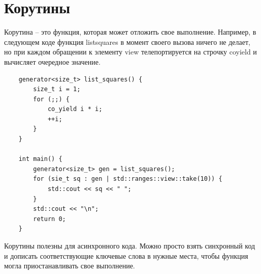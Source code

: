 \documentclass[12pt, a4paper]{article}
\begin{document}
\section{Корутины}
Корутина -- это функция, которая может отложить свое выполнение. Например, в следующем коде функция list\textunderscore squares в момент своего вызова ничего не делает, но при каждом обращении к элементу view телепортируется на строчку co\textunderscore yield и вычисляет очередное значение.
\begin{verbatim}
	generator<size_t> list_squares() {
		size_t i = 1;
		for (;;) {
			co_yield i * i;
			++i;
		}
	}
	
	int main() {
		generator<size_t> gen = list_squares();
		for (sie_t sq : gen | std::ranges::view::take(10)) {
			std::cout << sq << " ";
		}
		std::cout << "\n";
		return 0;
	}
\end{verbatim}
Корутины полезны для асинхронного кода. Можно просто взять синхронный код и дописать соответствующие ключевые слова в нужные места, чтобы функция могла приостанавливать свое выполнение.\\
\end{document}
